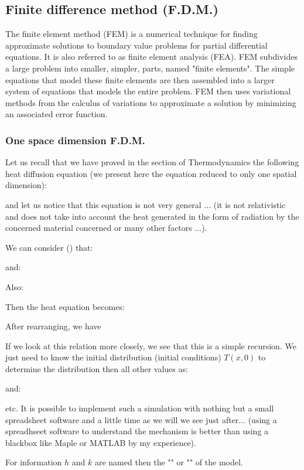 	\pagebreak
	\subsection{Finite difference method (F.D.M.)}
	The finite element method (FEM) is a numerical technique for finding approximate solutions to boundary value problems for partial differential equations. It is also referred to as finite element analysis (FEA). FEM subdivides a large problem into smaller, simpler, parts, named "finite elements". The simple equations that model these finite elements are then assembled into a larger system of equations that models the entire problem. FEM then uses variational methods from the calculus of variations to approximate a solution by minimizing an associated error function.
	
	\subsubsection{One space dimension F.D.M.}
	Let us recall that we have proved in the section of Thermodynamics the following heat diffusion equation (we present here the equation reduced to only one spatial dimension):
	
	and let us notice that this equation is not very general ... (it is not relativistic and does not take into account the heat generated in the form of radiation by the concerned material concerned or many other factors ...).

	We can consider () that:
	
	and:
	
	Also:
	
	Then the heat equation becomes:
	
	After rearranging, we have
	
	If we look at this relation more closely, we see that this is a simple recursion. We just need to know the initial distribution (initial conditions) $T(x,0)$ to determine the distribution then all other values as:
	
	and:
	
	etc.
	It is possible to implement such a simulation with nothing but a small spreadsheet software and a little time as we will we see just after... (using a spreadhseet software to understand the mechanism is better than using a blackbox like Maple or MATLAB by my experience).

	For information $h$ and $k$ are named then the "" or "" of the model.
	
